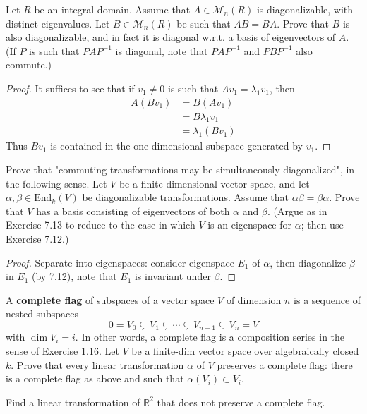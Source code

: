 \documentclass[openany]{book}
\newcommand{\R}{\mathbb{R}}
\begin{document}
\begin{prob}[7.13]
    Let \( R \) be an integral domain. Assume that \( A \in \mathcal{M}_n(R) \) is diagonalizable, with distinct eigenvalues. Let \( B \in \mathcal{M}_n(R) \) be such that \( AB = BA \). Prove that \( B \) is also diagonalizable, and in fact it is diagonal w.r.t. a basis of eigenvectors of \( A \). (If \( P \) is such that \( PAP^{-1} \) is diagonal, note that \( PAP^{-1} \) and \( PBP^{-1} \) also commute.)
\end{prob}
\begin{proof}
    It suffices to see that if $v_1\neq 0$ is such that $Av_1=\lambda_1v_1$, then
    \begin{align*}
        A(Bv_1)&=B(Av_1)\\
        &=B\lambda_1v_1\\
        &=\lambda_1(Bv_1)
    \end{align*}
    Thus $Bv_1$ is contained in the one-dimensional subspace generated by $v_1$.
\end{proof}


\begin{prob}[7.14]
    Prove that "commuting transformations may be simultaneously diagonalized", in the following sense. Let \( V \) be a finite-dimensional vector space, and let \( \alpha, \beta \in \text{End}_k(V) \) be diagonalizable transformations. Assume that \( \alpha\beta = \beta\alpha \). Prove that \( V \) has a basis consisting of eigenvectors of both \( \alpha \) and \( \beta \). (Argue as in Exercise 7.13 to reduce to the case in which \( V \) is an eigenspace for \( \alpha \); then use Exercise 7.12.)
\end{prob}
\begin{proof}
    Separate into eigenspaces: consider eigenspace $E_1$ of $\alpha$, then diagonalize $\beta$ in $E_1$ (by 7.12), note that $E_1$ is invariant under $\beta$.
\end{proof}

\begin{prob}[7.15]
    A \textbf{complete flag} of subspaces of a vector space \( V \) of dimension \( n \) is a sequence of nested subspaces
\[
0 = V_0 \subsetneq V_1 \subsetneq \cdots \subsetneq V_{n-1} \subsetneq V_n = V
\]
with \(\dim V_i = i\). In other words, a complete flag is a composition series in the sense of Exercise 1.16. Let $V$ be a finite-dim vector space over algebraically closed $k$. Prove that every linear transformation $\alpha$ of $V$ preserves a complete flag: there is a complete flag as above and such that $\alpha(V_i)\subset V_i$.

Find a linear transformation of $\R^2$ that does not preserve a complete flag.
\end{prob}
\end{document}
